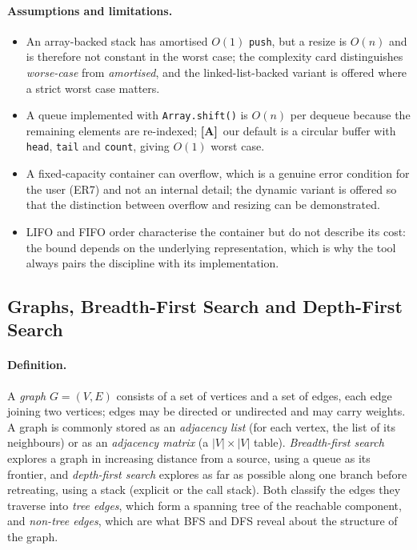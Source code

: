 \documentclass[11pt,a4paper]{article}
\newcommand{\A}{\textcolor{asmc}{\textbf{[A]}}}     %
\newcommand{\ct}[1]{\texttt{#1}}
\begin{document}
\paragraph{Assumptions and limitations.}
\begin{itemize}[leftmargin=1.6em,itemsep=2pt]
  \item An array-backed stack has amortised $O(1)$ \ct{push}, but a resize is $O(n)$ and is
        therefore not constant in the worst case; the complexity card distinguishes
        \emph{worse-case} from \emph{amortised}, and the linked-list-backed variant is
        offered where a strict worst case matters.
  \item A queue implemented with \ct{Array.shift()} is $O(n)$ per dequeue because the
        remaining elements are re-indexed; \A\ our default is a circular buffer with
        \ct{head}, \ct{tail} and \ct{count}, giving $O(1)$ worst case.
  \item A fixed-capacity container can overflow, which is a genuine error condition for the
        user (ER7) and not an internal detail; the dynamic variant is offered so that the
        distinction between overflow and resizing can be demonstrated.
  \item LIFO and FIFO order characterise the container but do not describe its cost: the
        bound depends on the underlying representation, which is why the tool always pairs
        the discipline with its implementation.
\end{itemize}

\subsection{Graphs, Breadth-First Search and Depth-First Search}

\paragraph{Definition.} A \emph{graph} $G = (V, E)$ consists of a set of vertices and a set
of edges, each edge joining two vertices; edges may be directed or undirected and may carry
weights. A graph is commonly stored as an \emph{adjacency list} (for each vertex, the list of
its neighbours) or as an \emph{adjacency matrix} (a $|V| \times |V|$ table). \emph{Breadth-first
search} explores a graph in increasing distance from a source, using a queue as its frontier,
and \emph{depth-first search} explores as far as possible along one branch before retreating,
using a stack (explicit or the call stack). Both classify the edges they traverse into
\emph{tree edges}, which form a spanning tree of the reachable component, and
\emph{non-tree edges}, which are what BFS and DFS reveal about the structure of the graph.
\end{document}
